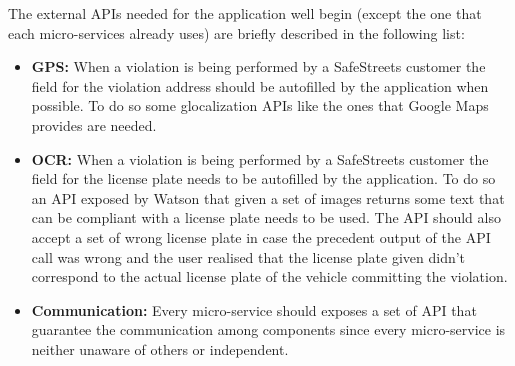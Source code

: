 The external APIs needed for the application well begin (except the one that each micro-services already uses) are briefly described in the following list:
\begin{itemize}
	\item \textbf{GPS:} When a violation is being performed by a SafeStreets customer the field for the violation address should be autofilled by the application when possible. To do so some glocalization APIs like the ones that Google Maps provides are needed.
	\item \textbf{OCR:} When a violation is being performed by a SafeStreets customer the field for the license plate needs to be autofilled by the application. To do so an API exposed by Watson that given a set of images returns some text that can be compliant with a license plate needs to be used. The API should also accept a set of wrong license plate in case the precedent output of the API call was wrong and the user realised that the license plate given didn't correspond to the actual license plate of the vehicle committing the violation.
	\item \textbf{Communication:} Every micro-service should exposes a set of API that guarantee the communication among components since every micro-service is neither unaware of others or independent.
\end{itemize}
